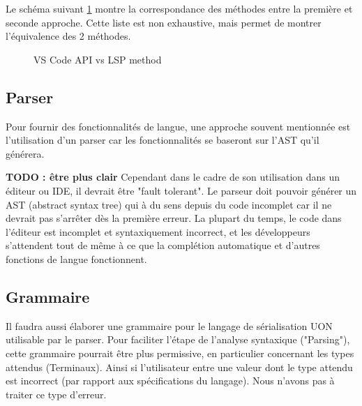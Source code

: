 \documentclass[
    iict, %
    il, %
]{heig-tb}
\begin{document}
Le schéma suivant \ref{api vs lsp} montre la correspondance des méthodes entre la première et seconde approche.
Cette liste est non exhaustive, mais permet de montrer l'équivalence des 2 méthodes.

\begin{figure}[!ht]
    \begin{center}
    \end{center}
    \caption[API vs LSP]{\label{api vs lsp} VS Code API vs LSP method}
\end{figure}

\subsection{Parser}
Pour fournir des fonctionnalités de langue, une approche souvent mentionnée est l'utilisation d'un parser
car les fonctionnalités se baseront sur l'AST qu'il générera.

\textbf{TODO : être plus clair}
Cependant dans le cadre de son utilisation dans un éditeur ou IDE, il devrait être "fault tolerant". Le parseur doit pouvoir générer un AST (abstract syntax tree) qui à du sens depuis du code incomplet
car il ne devrait pas s'arrêter dès la première erreur.
La plupart du temps, le code dans l'éditeur est incomplet et syntaxiquement incorrect, et les développeurs s'attendent tout de même à ce que la complétion automatique et d'autres fonctions de langue fonctionnent.

\subsection{Grammaire}
Il faudra aussi élaborer une grammaire pour le langage de sérialisation UON utilisable par le parser.
Pour faciliter l'étape de l'analyse syntaxique ("Parsing"), cette grammaire pourrait être plus permissive, en particulier concernant les types attendus (Terminaux).
Ainsi si l'utilisateur entre une valeur dont le type attendu est incorrect (par rapport aux spécifications du langage). Nous n'avons pas à traiter ce type d'erreur.
\end{document}
